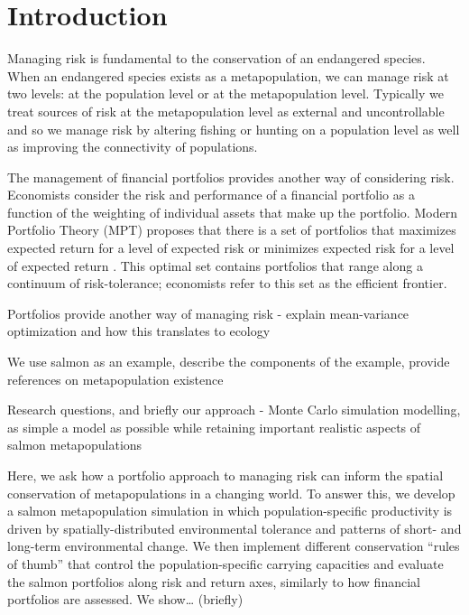 \section{Introduction}

Managing risk is fundamental to the conservation of an endangered
species. When an endangered species exists as a metapopulation, we can
manage risk at two levels: at the population level or at the
metapopulation level. Typically we treat sources of risk at the
metapopulation level as external and uncontrollable and so we manage
risk by altering fishing or hunting on a population level as well as
improving the connectivity of populations.

The management of financial portfolios provides another way of
considering risk. Economists consider the risk and performance of a
financial portfolio as a function of the weighting of individual assets
that make up the portfolio. Modern Portfolio Theory (MPT) proposes that
there is a set of portfolios that maximizes expected return for a level
of expected risk or minimizes expected risk for a level of expected
return \citep{Markowitz1952, Markowitz1959}. This optimal set contains
portfolios that range along a continuum of risk-tolerance; economists
refer to this set as the efficient frontier.

Portfolios provide another way of managing risk - explain mean-variance
optimization and how this translates to ecology
\citep{Figge2004}\citep{Hoekstra2012}
\citep[\citet{Ando2012}]{Ando2011}\citep[\citet{Markowitz1959}]{Markowitz1952}

We use salmon as an example, describe the components of the example,
provide references on metapopulation existence \citep{Schindler2010}

Research questions, and briefly our approach - Monte Carlo simulation
modelling, as simple a model as possible while retaining important
realistic aspects of salmon metapopulations

Here, we ask how a portfolio approach to managing risk can inform the
spatial conservation of metapopulations in a changing world. To answer
this, we develop a salmon metapopulation simulation in which
population-specific productivity is driven by spatially-distributed
environmental tolerance and patterns of short- and long-term
environmental change. We then implement different conservation ``rules
of thumb'' that control the population-specific carrying capacities and
evaluate the salmon portfolios along risk and return axes, similarly to
how financial portfolios are assessed. We show\ldots{} (briefly)

